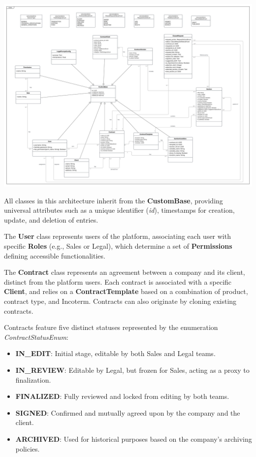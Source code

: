 \begin{center}
    \centering
    \includegraphics[width=1\textwidth]{Images/Class Diagram.png}
    \label{fig:class_diagram}
\end{center}

All classes in this architecture inherit from the \textbf{CustomBase}, providing universal attributes such as a unique identifier (\textit{id}), timestamps for creation, update, and deletion of entries.\mynewline

The \textbf{User} class represents users of the platform, associating each user with specific \textbf{Roles} (e.g., Sales or Legal), which determine a set of \textbf{Permissions} defining accessible functionalities.\mynewline

The \textbf{Contract} class represents an agreement between a company and its client, distinct from the platform users. Each contract is associated with a specific \textbf{Client}, and relies on a \textbf{ContractTemplate} based on a combination of product, contract type, and Incoterm. Contracts can also originate by cloning existing contracts.\mynewline

Contracts feature five distinct statuses represented by the enumeration \textit{ContractStatusEnum}:

\begin{itemize}
    \item \textbf{IN\_EDIT}: Initial stage, editable by both Sales and Legal teams.
    \item \textbf{IN\_REVIEW}: Editable by Legal, but frozen for Sales, acting as a proxy to finalization.
    \item \textbf{FINALIZED}: Fully reviewed and locked from editing by both teams.
    \item \textbf{SIGNED}: Confirmed and mutually agreed upon by the company and the client.
    \item \textbf{ARCHIVED}: Used for historical purposes based on the company's archiving policies.
\end{itemize}

